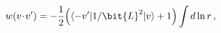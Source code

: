 \begin{equation}
w(v \!\cdot\! v')
= - \frac{1}{2}
\Big( \langle -v' | 1/\bit{L}^2 | v \rangle + 1 \Big) \int {d \ln r}
\, ,
\end{equation}

